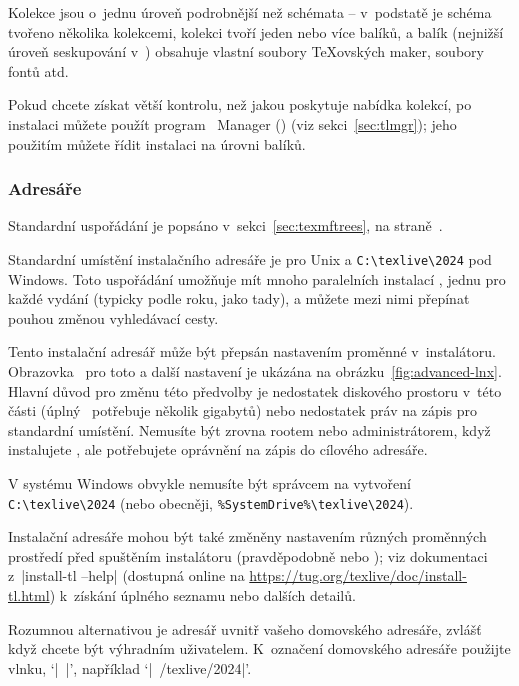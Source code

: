 \documentclass[\classoptions,slovak,english,czech]{\classname}
\def\p.{na straně~}
\begin{document}
Kolekce jsou o~jednu úroveň podrobnější než schémata -- v~podstatě
je schéma tvořeno několika kolekcemi, kolekci tvoří jeden nebo více
balíků, a balík (nejnižší úroveň seskupování v~\TL) obsahuje vlastní
soubory \TeX ovských maker, soubory fontů atd. 

Pokud chcete získat větší kontrolu, než jakou poskytuje nabídka kolekcí, 
po instalaci můžete použít program \TL\ Manager () 
(viz sekci~\ref{sec:tlmgr}); jeho použitím můžete řídit 
instalaci na úrovni balíků.

\subsubsection{Adresáře}
\label{sec:directories}

Standardní uspořádání je popsáno v~sekci~\ref{sec:texmftrees},
\p.\pageref{sec:texmftrees}. 

Standardní umístění instalačního adresáře je
 pro Unix
a \verb|C:\texlive\2024| pod Windows.
Toto uspořádání umožňuje mít mnoho paralelních instalací \TL, jednu pro každé vydání
(typicky podle roku, jako tady),
a můžete mezi nimi přepínat pouhou změnou vyhledávací cesty.

Tento instalační adresář může být přepsán nastavením proměnné  v~instalátoru.
Obrazovka \GUI\ pro toto a další nastavení je ukázána na obrázku~\ref{fig:advanced-lnx}.
Hlavní důvod pro změnu této předvolby je nedostatek diskového prostoru v~této části
(úplný \TL\ potřebuje několik gigabytů) nebo nedostatek práv
na zápis pro standardní umístění.
Nemusíte být zrovna rootem nebo administrátorem, když 
instalujete \TL, ale potřebujete oprávnění na zápis do cílového adresáře.

V systému Windows obvykle nemusíte být správcem
na vytvoření \verb|C:\texlive\2024| (nebo obecněji,
\verb|%SystemDrive%\texlive\2024|). 

Instalační adresáře mohou být také změněny nastavením různých proměnných 
prostředí před spuštěním instalátoru (pravděpodobně
 nebo
); viz dokumentaci z~|install-tl --help| 
(dostupná online na
\url{https://tug.org/texlive/doc/install-tl.html}) k~získání úplného seznamu 
nebo dalších detailů.

Rozumnou alternativou je adresář uvnitř vašeho domovského
adresáře, zvlášť když chcete být výhradním uživatelem. 
K~označení domovského adresáře použijte vlnku, `|~|',
například `|~/texlive/2024|'.
\end{document}
